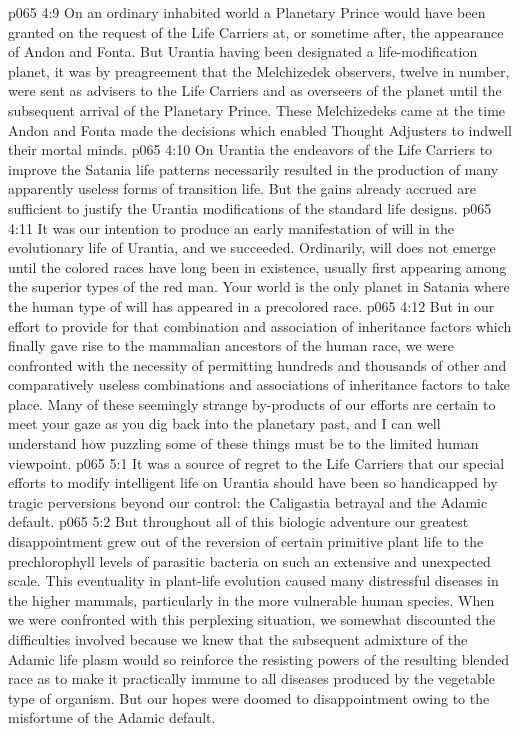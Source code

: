 \vs p065 4:9 On an ordinary inhabited world a Planetary Prince would have been granted on the request of the Life Carriers at, or sometime after, the appearance of Andon and Fonta. But Urantia having been designated a life\hyp{}modification planet, it was by preagreement that the Melchizedek observers, twelve in number, were sent as advisers to the Life Carriers and as overseers of the planet until the subsequent arrival of the Planetary Prince. These Melchizedeks came at the time Andon and Fonta made the decisions which enabled Thought Adjusters to indwell their mortal minds.
\vs p065 4:10 \pc On Urantia the endeavors of the Life Carriers to improve the Satania life patterns necessarily resulted in the production of many apparently useless forms of transition life. But the gains already accrued are sufficient to justify the Urantia modifications of the standard life designs.
\vs p065 4:11 It was our intention to produce an early manifestation of will in the evolutionary life of Urantia, and we succeeded. Ordinarily, will does not emerge until the colored races have long been in existence, usually first appearing among the superior types of the red man. Your world is the only planet in Satania where the human type of will has appeared in a precolored race.
\vs p065 4:12 But in our effort to provide for that combination and association of inheritance factors which finally gave rise to the mammalian ancestors of the human race, we were confronted with the necessity of permitting hundreds and thousands of other and comparatively useless combinations and associations of inheritance factors to take place. Many of these seemingly strange by\hyp{}products of our efforts are certain to meet your gaze as you dig back into the planetary past, and I can well understand how puzzling some of these things must be to the limited human viewpoint.
\vs p065 5:1 It was a source of regret to the Life Carriers that our special efforts to modify intelligent life on Urantia should have been so handicapped by tragic perversions beyond our control: the Caligastia betrayal and the Adamic default.
\vs p065 5:2 But throughout all of this biologic adventure our greatest disappointment grew out of the reversion of certain primitive plant life to the prechlorophyll levels of parasitic bacteria on such an extensive and unexpected scale. This eventuality in plant\hyp{}life evolution caused many distressful diseases in the higher mammals, particularly in the more vulnerable human species. When we were confronted with this perplexing situation, we somewhat discounted the difficulties involved because we knew that the subsequent admixture of the Adamic life plasm would so reinforce the resisting powers of the resulting blended race as to make it practically immune to all diseases produced by the vegetable type of organism. But our hopes were doomed to disappointment owing to the misfortune of the Adamic default.

